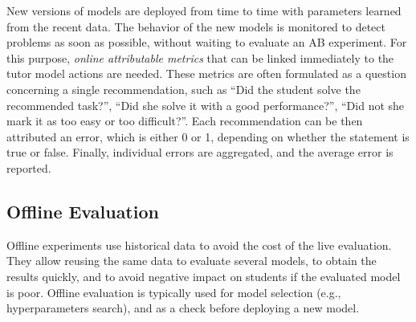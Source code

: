 
New versions of models are deployed from time to time
  with parameters learned from the recent data.
The behavior of the new models is monitored
  to detect problems as soon as possible,
  without waiting to evaluate an AB experiment.
For this purpose, \emph{online attributable metrics} that can be linked
  immediately to the tutor model actions are needed.
These metrics are often formulated as a question concerning a single recommendation,
such as
``Did the student solve the recommended task?'',
``Did she solve it with a good performance?'',
``Did not she mark it as too easy or too difficult?''.
Each recommendation can be then attributed an error, which is either 0 or 1, depending
on whether the statement is true or false.
Finally, individual errors are aggregated, and the average error is reported.





\subsection{Offline Evaluation}

Offline experiments use historical data to avoid the cost of the live evaluation.
They allow reusing the same data to evaluate several models,
  to obtain the results quickly,
  and to avoid negative impact on students if the evaluated model is poor.
Offline evaluation is typically used
for model selection (e.g., hyperparameters search),
and as a check before deploying a new model. %


